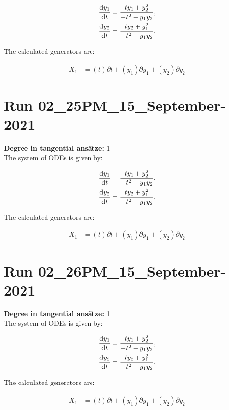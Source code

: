 \begin{align*}
\dv{y_{1}}{t}&=\frac{t y_{1} + y_{2}^{2}}{- t^{2} + y_{1} y_{2}},\\
\dv{y_{2}}{t}&=\frac{t y_{2} + y_{1}^{2}}{- t^{2} + y_{1} y_{2}}.\\
\end{align*}

\noindent The calculated generators are:

\begin{align*}
X_{1}&=\left( t \right)\partial t+\left( y_{1} \right)\partial y_{1}+\left( y_{2} \right)\partial y_{2}\end{align*}
\section*{Run 02\_25PM\_15\_September-2021}
\textbf{Degree in tangential ansätze:}	1\\
The system of ODEs is given by:

\begin{align*}
\dv{y_{1}}{t}&=\frac{t y_{1} + y_{2}^{2}}{- t^{2} + y_{1} y_{2}},\\
\dv{y_{2}}{t}&=\frac{t y_{2} + y_{1}^{2}}{- t^{2} + y_{1} y_{2}}.\\
\end{align*}

\noindent The calculated generators are:

\begin{align*}
X_{1}&=\left( t \right)\partial t+\left( y_{1} \right)\partial y_{1}+\left( y_{2} \right)\partial y_{2}\end{align*}
\section*{Run 02\_26PM\_15\_September-2021}
\textbf{Degree in tangential ansätze:}	1\\
The system of ODEs is given by:

\begin{align*}
\dv{y_{1}}{t}&=\frac{t y_{1} + y_{2}^{2}}{- t^{2} + y_{1} y_{2}},\\
\dv{y_{2}}{t}&=\frac{t y_{2} + y_{1}^{2}}{- t^{2} + y_{1} y_{2}}.\\
\end{align*}

\noindent The calculated generators are:

\begin{align*}
X_{1}&=\left( t \right)\partial t+\left( y_{1} \right)\partial y_{1}+\left( y_{2} \right)\partial y_{2}\end{align*}
